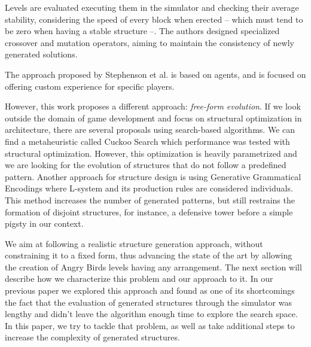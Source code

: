 \documentclass[a4paper,twoside]{article}
\begin{document}
Levels are evaluated executing them in the simulator and checking
their average stability, considering the speed of every block when
erected -- which must tend to be zero when having a stable structure
--. The authors designed specialized crossover and mutation operators,
aiming to maintain the consistency of newly generated solutions.

The approach proposed by Stephenson et al. \cite{stephenson2019agent}
is based on agents, and is focused on offering custom experience for
specific players. 

However, this work proposes a different approach: \textit{free-form
  evolution}.  If we look outside the domain of game development and
focus on structural optimization in architecture, there are several
proposals using search-based algorithms. We can find a metaheuristic
called Cuckoo Search \cite{gandomi2013cuckoo} which performance was
tested with structural optimization. However, this optimization is
heavily parametrized and we are looking for the evolution of
structures that do not follow a predefined pattern.  Another approach
for structure design is using Generative Grammatical Encodings
\cite{hornby2001advantages} where L-system and its production rules
are considered individuals. This method increases the number of
generated patterns,  but still restrains the formation of disjoint
structures, for instance, a defensive tower before a simple pigsty in
our context. 

We aim at following a realistic structure generation approach, without
constraining it to a fixed form, thus advancing the state of the art
by allowing the creation of Angry Birds levels having any
arrangement. The next section will describe how we characterize this
problem and our approach to it. In our previous paper
\cite{DBLP:conf/evoW/CalleGGV19} we explored this approach and found
as one of its shortcomings the fact that the evaluation of generated
structures through the simulator was lengthy and didn't leave the
algorithm enough time to explore the search space. In this paper, we
try to tackle that problem, as well as take additional steps to
increase the complexity of generated structures. 
\end{document}
